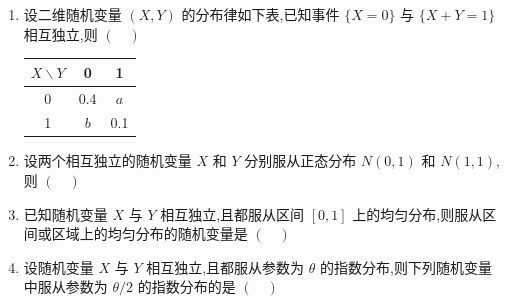\begin{enumerate}
    \item 设二维随机变量 $(X,Y)$ 的分布律如下表,已知事件 $\{X=0\}$ 与 $\{X+Y=1\}$ 相互独立,则 $(\quad)$
    \begin{center}
    \begin{tabular}{c|cc}
        \hline
        $X\backslash Y$ & 0 & 1 \\
        \hline
        0 & 0.4 & $a$ \\
        1 & $b$ & 0.1 \\
        \hline
    \end{tabular}
    \end{center}

    \item 设两个相互独立的随机变量 $X$ 和 $Y$ 分别服从正态分布 $N(0,1)$ 和 $N(1,1)$,则 $(\quad)$

    \item 已知随机变量 $X$ 与 $Y$ 相互独立,且都服从区间 $[0,1]$ 上的均匀分布,则服从区间或区域上的均匀分布的随机变量是 $(\quad)$

    \item 设随机变量 $X$ 与 $Y$ 相互独立,且都服从参数为 $\theta$ 的指数分布,则下列随机变量中服从参数为 $\theta/2$ 的指数分布的是 $(\quad)$


\end{enumerate}
